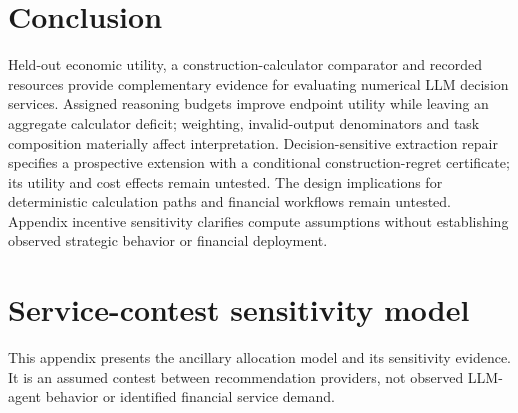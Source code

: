 \documentclass[sigconf,anonymous,nonacm]{acmart}
\begin{document}
\section{Conclusion}
Held-out economic utility, a construction-calculator comparator and recorded resources provide complementary evidence for evaluating numerical LLM decision services. Assigned reasoning budgets improve endpoint utility while leaving an aggregate calculator deficit; weighting, invalid-output denominators and task composition materially affect interpretation. Decision-sensitive extraction repair specifies a prospective extension with a conditional construction-regret certificate; its utility and cost effects remain untested. The design implications for deterministic calculation paths and financial workflows remain untested. Appendix incentive sensitivity clarifies compute assumptions without establishing observed strategic behavior or financial deployment.
\FloatBarrier


\clearpage
\appendix
\section{Service-contest sensitivity model}\label{app:servicecontest}
This appendix presents the ancillary allocation model and its sensitivity evidence. It is an assumed contest between recommendation providers, not observed LLM-agent behavior or identified financial service demand.

\end{document}
